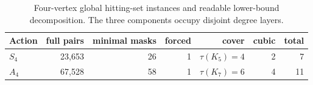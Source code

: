 \begin{table}[htbp]
\centering
\caption{Four-vertex global hitting-set instances and readable lower-bound
decomposition.  The three components occupy disjoint degree layers.}
\label{tab:n4-minima}
\begin{tabular}{lrrrrrr}
\toprule
Action & full pairs & minimal masks & forced & cover & cubic & total\\
\midrule
$S_4$ & 23,653 & 26 & 1 & $\tau(K_5)=4$ & 2 & 7\\
$A_4$ & 67,528 & 58 & 1 & $\tau(K_7)=6$ & 4 & 11\\
\bottomrule
\end{tabular}
\end{table}
